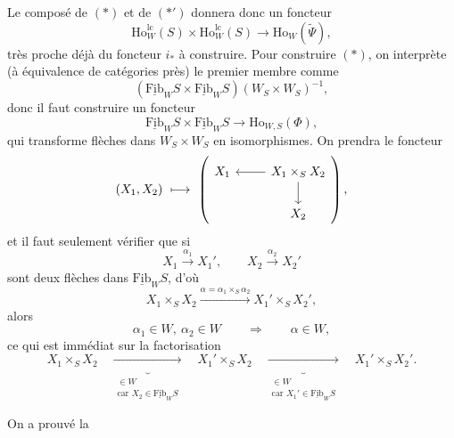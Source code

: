 \documentclass[11pt]{article}
\newcommand{\printedpage}[1]{\marginpar{\footnotesize p.~#1}}
\newcommand{\msp}[1]{\marginpar{\footnotesize [#1]}}
\newcommand{\Fibu}{\underline{\mathrm{Fib}}}
\newcommand{\Ho}{\mathrm{Ho}}
\newcommand{\lc}{\mathrm{lc}}
\begin{document}
\msp{page 245}
Le composé de $(*)$ et de $(*')$ donnera donc un foncteur
\[
\Ho^{\lc}_W(S) \times \Ho^{\lc}_W(S) \longrightarrow \Ho_W(\tilde{\Psi}), \tag*{$(**)$}
\]
très proche déjà du foncteur $i_*$ à construire. Pour construire $(*)$, on interprète (à équivalence de catégories près) le premier membre comme
\[
(\Fibu_W S \times \Fibu_W S)(W_S \times W_S)^{-1},
\]
donc il faut construire un foncteur
\[
\Fibu_W S \times \Fibu_W S \longrightarrow \Ho_{W,S}(\Phi),
\]
qui transforme flèches dans $W_S \times W_S$ en isomorphismes. On prendra le foncteur
\[
(X_1, X_2) \ \longmapsto \
\left(
\begin{tikzcd}[ampersand replacement=\&]
X_1 \& X_1 \times_S X_2 \arrow[l] \arrow[d] \\
 \& X_2
\end{tikzcd}
\right),
\]
\printedpage{159}
et il faut seulement vérifier que si
\[
X_1 \xrightarrow{\alpha_1} X_1', \qquad X_2 \xrightarrow{\alpha_2} X_2'
\]
sont deux flèches dans $\Fibu_W S$, d'où
\[
X_1 \times_S X_2 \xrightarrow{\alpha = \alpha_1 \times_S \alpha_2} X_1' \times_S X_2',
\]
alors
\[
\alpha_1 \in W,\ \alpha_2 \in W \qquad \Longrightarrow \qquad \alpha \in W,
\]
ce qui est immédiat sur la factorisation
\[
X_1 \times_S X_2 \quad \underbrace{\longrightarrow}_{\substack{\in W \\ \text{car } X_2 \in \Fibu_W S}} \quad X_1' \times_S X_2 \quad \underbrace{\longrightarrow}_{\substack{\in W \\ \text{car } X_1' \in \Fibu_W S}} \quad X_1' \times_S X_2'.
\]

\msp{page 246}
On a prouvé la
\end{document}
